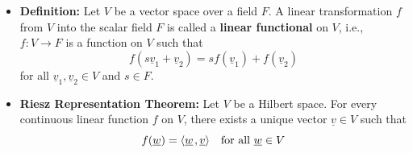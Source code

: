\documentclass[11pt,twoside]{report}
\newcommand{\vecnot}{\underline}
\newcommand{\inner}[2]{{\left\langle #1 \mskip2mu , #2 \right\rangle}}
\begin{document}
\begin{itemize}
\item \textbf{Definition:}  
Let $V$ be a vector space over a field $F$.
A linear transformation $f$ from $V$ into the scalar field $F$ is called a \textbf{linear functional} on $V$, i.e., $f\colon V \to F$ is a function on $V$ such that
\begin{equation*}
f \left( s \vecnot{v}_1 + \vecnot{v}_2 \right)
= s f \left( \vecnot{v}_1 \right) + f \left( \vecnot{v}_2 \right)
\end{equation*}
for all $\vecnot{v}_1, \vecnot{v}_2 \in V$ and $s \in F$.


\item \textbf{Riesz Representation Theorem:} %
Let $V$ be a Hilbert space. For every continuous linear function $f$ on $V$, there %
 exists a unique vector $\vecnot{v} \in V$ such that 
\[
f \left( \vecnot{w} \right) = \inner{ \vecnot{w} }{ \vecnot{v} } \quad \text{for all $\vecnot{w} \in V$}
\]



\end{itemize}

 
\end{document}

